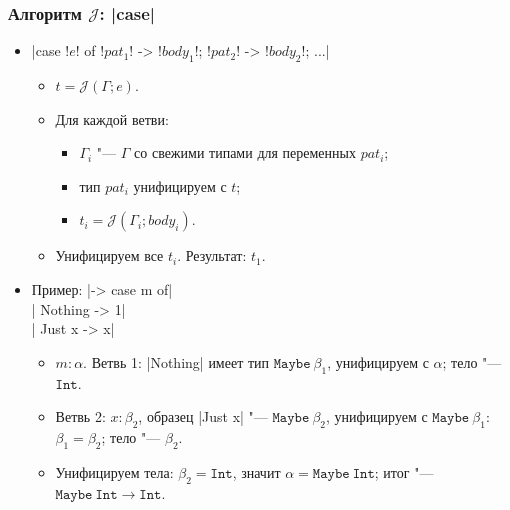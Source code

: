 \documentclass[11pt]{beamer}
\newcommand{\tInt}{\mathtt{Int}}
\newcommand{\tMaybe}{\mathtt{Maybe}}
\newcommand{\J}{\mathcal{J}}
\begin{document}
\begin{frame}[fragile]
  \frametitle{Алгоритм $\J$: \haskinline|case|}
  \begin{itemize}
    \item \haskinline|case !$e$! of !$pat_1$! -> !$body_1$!; !$pat_2$! -> !$body_2$!; ...|
          \pause
          \begin{itemize}
            \item $t = \J(\Gamma; e)$.
            \item Для каждой ветви:
                  \begin{itemize}
                    \item $\Gamma_i$ "--- $\Gamma$ со свежими типами для переменных $pat_i$;
                    \item тип $pat_i$ унифицируем с $t$;
                    \item $t_i = \J(\Gamma_i; body_i)$.
                  \end{itemize}
            \item Унифицируем все $t_i$. Результат: \pause $t_1$.
          \end{itemize}
          \pause
    \item Пример: \haskinline|\m -> case m of|\\
          \hphantom{Пример: }\haskinline|  Nothing -> 1|\\
          \hphantom{Пример: }\haskinline|  Just x  -> x|
          \begin{itemize}
            \item $m : \alpha$. Ветвь 1: \pause \haskinline|Nothing| имеет тип $\tMaybe~\beta_1$, унифицируем с $\alpha$; тело "--- $\tInt$.
                  \pause
            \item Ветвь 2: \pause $x : \beta_2$, образец \haskinline|Just x| "--- $\tMaybe~\beta_2$, унифицируем с $\tMaybe~\beta_1$: $\beta_1 = \beta_2$; тело "--- $\beta_2$.
                  \pause
            \item Унифицируем тела: \pause $\beta_2 = \tInt$, значит $\alpha = \tMaybe~\tInt$; итог "--- \pause $\tMaybe~\tInt \to \tInt$.
          \end{itemize}
  \end{itemize}
\end{frame}
\end{document}
